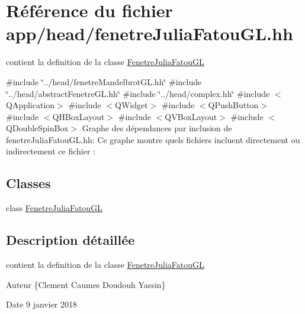\hypertarget{fenetreJuliaFatouGL_8hh}{}\section{Référence du fichier app/head/fenetre\+Julia\+Fatou\+GL.hh}
\label{fenetreJuliaFatouGL_8hh}


contient la definition de la classe \hyperlink{classFenetreJuliaFatouGL}{Fenetre\+Julia\+Fatou\+GL}  


{\ttfamily \#include \char`\"{}../head/fenetre\+Mandelbrot\+G\+L.\+hh\char`\"{}}\newline
{\ttfamily \#include \char`\"{}../head/abstract\+Fenetre\+G\+L.\+hh\char`\"{}}\newline
{\ttfamily \#include \char`\"{}../head/complex.\+hh\char`\"{}}\newline
{\ttfamily \#include $<$Q\+Application$>$}\newline
{\ttfamily \#include $<$Q\+Widget$>$}\newline
{\ttfamily \#include $<$Q\+Push\+Button$>$}\newline
{\ttfamily \#include $<$Q\+H\+Box\+Layout$>$}\newline
{\ttfamily \#include $<$Q\+V\+Box\+Layout$>$}\newline
{\ttfamily \#include $<$Q\+Double\+Spin\+Box$>$}\newline
Graphe des dépendances par inclusion de fenetre\+Julia\+Fatou\+G\+L.\+hh\+:
Ce graphe montre quels fichiers incluent directement ou indirectement ce fichier \+:
\subsection*{Classes}
\begin{DoxyCompactItemize}
\item 
class \hyperlink{classFenetreJuliaFatouGL}{Fenetre\+Julia\+Fatou\+GL}
\end{DoxyCompactItemize}


\subsection{Description détaillée}
contient la definition de la classe \hyperlink{classFenetreJuliaFatouGL}{Fenetre\+Julia\+Fatou\+GL} 

\begin{DoxyAuthor}{Auteur}
\{Clement Caumes Doudouh Yassin\} 
\end{DoxyAuthor}
\begin{DoxyDate}{Date}
9 janvier 2018 
\end{DoxyDate}
